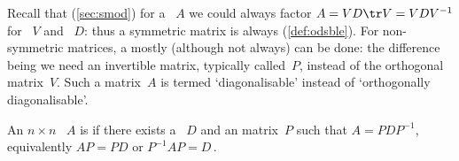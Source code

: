Recall that (\autoref{sec:smod}) for a ~\(A\) we could always factor \(A=VD\tr V=VDV^{-1}\) for ~\(V\) and ~\(D\): thus a symmetric matrix is always  (\autoref{def:odsble}).
For non-symmetric matrices, a  mostly (although not always) can be done:
the difference being we need an invertible matrix, typically called~\(P\), instead of the orthogonal matrix~\(V\).
Such a matrix~\(A\) is termed `diagonalisable' instead of `orthogonally diagonalisable'.


\begin{definition} \label{def:diagonalise} 
An \(n\times n\) ~\(A\) is  if there exists a ~\(D\) and an  matrix~\(P\) such that \(A=PDP^{-1}\), equivalently \(AP=PD\) or \(P^{-1}AP=D\)\,.
\end{definition}


